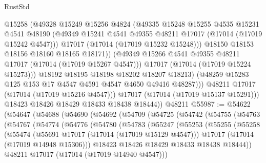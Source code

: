 \begin{lexlean}{RustStd}
\begin{coremodule}
{\begin{coremodule}
{{{{{{{{{{{{{{{{{{{{{{{{{{{{{{{{{{{{{{{{{{{{{{{{{{{{{{{                      @15258
                      (@49328
                        @15249
                        @15256
                        @4824
                        (@49335
                          @15248
                          @15255
                          @4535
                          @15231
                          @4541
                          @48190
                          (@49349 @15241 @4541 @49355 @48211 @17017 (@17014 (@17019 @15242 @4547)))
                          @17017
                          (@17014 (@17019 @15232 @15248)))
                        @18150
                        @18153
                        @18156
                        @18160
                        @18165
                        @18171))
                    (@49349 @15266 @4541 @49355 @48211 @17017 (@17014 (@17019 @15267 @4547)))
                    @17017
                    (@17014 (@17019 @15224 @15273)))
                  @18192
                  @18195
                  @18198
                  @18202
                  @18207
                  @18213)
                (@48259 @15283 @125 @153 @17 @4547 @4591 @4547 @4650 @49416 @48287)))
            @48211
            @17017
            (@17014 (@17019 @15216 @4547)))
          @17017
          (@17014 (@17019 @15137 @15291)))
        @18423
        @18426
        @18429
        @18433
        @18438
        @18444))
    @48211
@55987 := @54622
    (@54647
      (@54688
        (@54690
          (@54692
            (@54709
              (@54725
                (@54742
                  (@54755
                    (@54763
                      (@54767
                        (@54774
                          (@54776
                            (@54780
                              (@54783
                                (@55247
                                  (@55253
                                    (@55255
                                      (@55258
                                        (@55474
                                          (@55691 @17017 (@17014 (@17019 @15129 @4547)))
                                          @17017
                                          (@17014 (@17019 @14948 @15306)))
                                        @18423
                                        @18426
                                        @18429
                                        @18433
                                        @18438
                                        @18444))
                                    @48211
                                    @17017
                                    (@17014 (@17019 @14940 @4547)))
}}}}}}}}}}}}}}}}}}}}}}}}}}}}}}}}}}}}}}}}}}}}}}}}}}}}}}}
\end{coremodule}}
\end{coremodule}
\end{lexlean}
